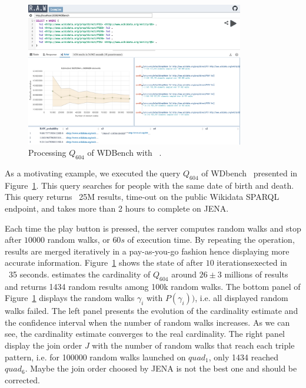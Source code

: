  \begin{figure}
   \centering
   \includegraphics[width=0.85\textwidth]{figures/raw_screenshot.png}
   \caption{\label{fig:raw_screenshot} Processing  $Q_{604}$ of
     WDBench\cite{angles2022wdbench} with ~\NAME.}
 \end{figure}


 As a motivating example, we executed the query $Q_{604}$ of
 WDbench~\cite{angles2022wdbench} presented in
 Figure~\ref{fig:raw_screenshot}. This query searches for people
 with the same date of birth and death. This query returns ~25M results,
 time-out on the public Wikidata SPARQL endpoint, and takes more than
 2 hours to complete on JENA.

 Each time the play button is pressed, the server computes random
 walks and stop after $10 000$ random walks, or $60s$ of execution
 time. By repeating the operation, results are merged iteratively in a
 pay-as-you-go fashion hence displaying more accurate
 information. Figure~\ref{fig:raw_screenshot} shows the state of after
 $10$ iterationsexected in ~35 seconds. \NAME estimates
 the cardinality of $Q_{604}$ around $26 \pm 3$ millions of results
 and returns 1434 random results among 100k random walks.
% 
 The bottom panel of Figure~\ref{fig:raw_screenshot} displays the
 random walks $\gamma_i$ with $P(\gamma_i))$, i.e. all displayed
 random walks failed.  The left panel presents the evolution of the
 cardinality estimate and the confidence interval when the number of
 random walks increases. As we can see, the cardinality estimate
 converges to the real cardinality.  The right panel display the join
 order $J$ with the number of random walks that reach each triple
 pattern, i.e. for 100000 random walks launched on $quad_1$, only 1434
 reached $quad_6$. Maybe the join order choosed by JENA is not the
 best one and should be corrected.


